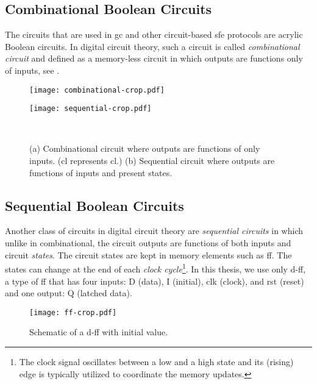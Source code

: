 \subsection{Combinational Boolean Circuits}\label{ssec:prelim-comb}
The circuits that are used in \acrshort{gc} and other circuit-based \acrshort{sfe} protocols are acrylic Boolean circuits.
In digital circuit theory, such a circuit is called \emph{combinational circuit} and defined as a memory-less circuit in which outputs are functions only of inputs, see .

\begin{figure}
    \centering
    \begin{minipage}[t]{0.4\textwidth}
        \texttt{[image: combinational-crop.pdf]}
        \label{fig:combinational}
    \end{minipage}
    \begin{minipage}[t]{0.45\textwidth}
        \texttt{[image: sequential-crop.pdf]}
        \label{fig:sequential}
    \end{minipage}\\
    \caption{(a) Combinational circuit where outputs are functions of only inputs. (\acrfull{cl} represents \acrlong{cl}.)
    (b) Sequential circuit where outputs are functions of inputs and present states.
    }\label{fig:combinational-sequential}
\end{figure}

\subsection{Sequential Boolean Circuits}\label{ssec:prelim-seq}
Another class of circuits in digital circuit theory are \emph{sequential circuits} in which unlike in combinational, the circuit outputs are functions of both inputs and circuit \emph{states}.
The circuit states are kept in memory elements such as \acrfull{ff}.
The states can change at the end of each \emph{clock cycle}\footnote{The clock signal oscillates between a low and a high state and its (rising) edge is typically utilized to coordinate the memory updates.}.
In this thesis, we use only \acrfull{d-ff}, a type of \acrshort{ff} that has four inputs: D (data), I (initial), clk (clock), and rst (reset) and one output: Q (latched data).

\begin{figure}
    \centering
	\texttt{[image: ff-crop.pdf]}
	\caption{Schematic of a \acrshort{d-ff} with initial value.}
	\label{fig:ff}
\end{figure}

